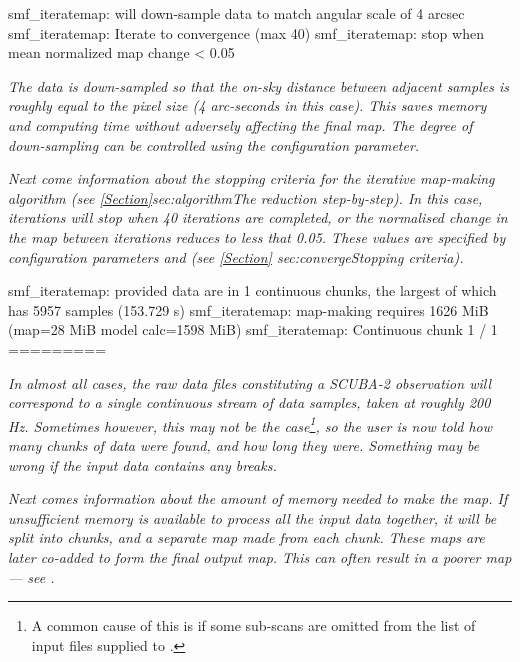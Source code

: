 \begin{terminalv}
smf_iteratemap: will down-sample data to match angular scale of 4 arcsec
smf_iteratemap: Iterate to convergence (max 40)
smf_iteratemap: stop when mean normalized map change < 0.05
\end{terminalv}

\emph{The data is down-sampled so that the on-sky distance between
adjacent samples is roughly equal to the pixel size (4 arc-seconds in
this case). This saves memory and computing time without adversely
affecting the final map. The degree of down-sampling can be controlled
using the  configuration parameter.}

\emph{Next come information about the stopping criteria for the iterative
map-making algorithm (see \cref{Section}{sec:algorithm}{The reduction
step-by-step}). In this case, iterations will stop when 40 iterations are
completed, or the normalised change in the map between iterations reduces
to less that 0.05. These values are specified by configuration parameters
 and  (see \cref{Section}
{sec:converge}{Stopping criteria}).}

\begin{terminalv}
smf_iteratemap: provided data are in 1 continuous chunks, the largest of which
has 5957 samples (153.729 s)
smf_iteratemap: map-making requires 1626 MiB (map=28 MiB model calc=1598 MiB)
smf_iteratemap: Continuous chunk 1 / 1 =========
\end{terminalv}
\emph{In almost all cases, the raw data files constituting a SCUBA-2
observation will correspond to a single continuous stream of data
samples, taken at roughly 200 Hz. Sometimes however, this may not be the
case\footnote{A common cause of this is if some sub-scans are omitted
from the list of input files supplied to .}, so the user is
now told how many chunks of data were found, and how long they were.
Something may be wrong if the input data contains any breaks.}

\emph{Next comes information about the amount of memory needed to make
the map. If unsufficient memory is available to process all the input
data together, it will be split into chunks, and a separate map made from
each chunk. These maps are later co-added to form the final output map.
This can often result in a poorer map --- see 
{}.}

